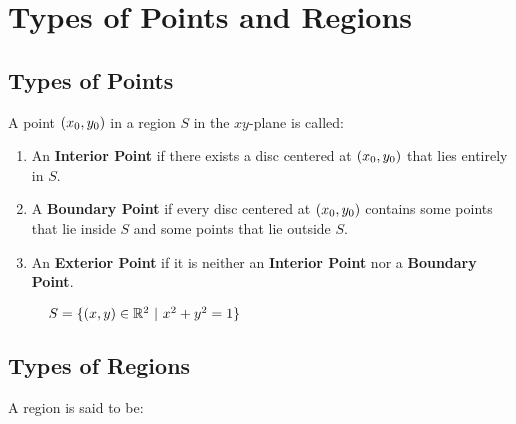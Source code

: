 \section{Types of Points and Regions}

\subsection{Types of Points}
A point $(x_0, y_0)$ in a region $S$ in the $xy$-plane is called:

\begin{enumerate}
    \item An \textbf{Interior Point} if there exists a disc centered at $(x_0, y_0)$ that lies entirely in $S$.

    \item A \textbf{Boundary Point} if every disc centered at $(x_0, y_0)$ contains some points that lie inside $S$ and some
    points that lie outside $S$.

    \item An \textbf{Exterior Point} if it is neither an \textbf{Interior Point} nor a \textbf{Boundary Point}.
\end{enumerate}

\begin{figure}[htp]
    \centering
    \caption{$S = \{(x, y) \in \mathbb{R}^2\ |\ x^2 + y^2 = 1\}$}
\end{figure}


\subsection{Types of Regions}
A region is said to be:

